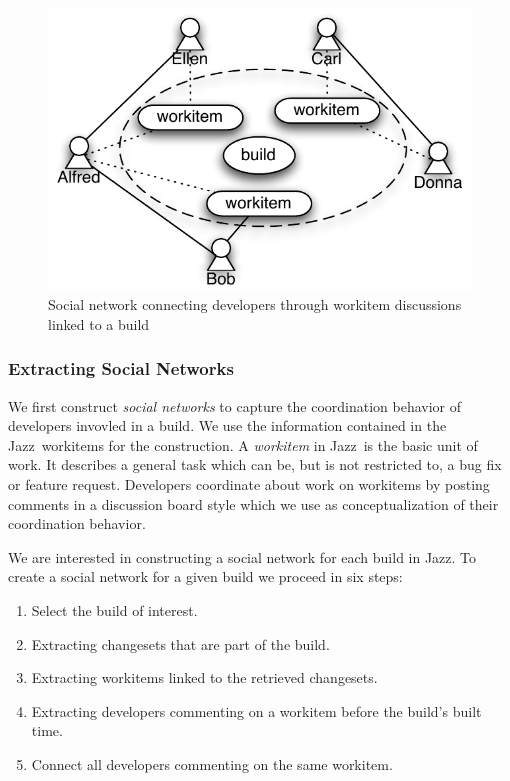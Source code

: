 \documentclass{sig-alternate}
\begin{document}
\begin{figure}[t]
\centering
\includegraphics[width=.8\columnwidth]{buildsn}
\caption{Social network connecting developers through workitem discussions linked to a build}
\label{fig:buildsn}
\end{figure}

\subsubsection{Extracting Social Networks}
We first construct \emph{social networks} to capture the coordination behavior of
developers invovled in a build. We use the information contained in the
Jazz\texttrademark\ workitems for the construction. A \emph{workitem} in Jazz\texttrademark\ is the basic unit of
work. It describes a general task which can be, but is not restricted to, a bug fix or feature request.
Developers coordinate about work on workitems by posting comments in a
discussion board style which we use as conceptualization of their coordination behavior. 


We are interested in constructing a social network for each
build in Jazz\texttrademark. 
To create a social network for a given build we proceed in six steps:

\begin{enumerate}
\item Select the build of interest.
\item Extracting changesets that are part of the build.
\item Extracting workitems linked to the retrieved changesets.
\item Extracting developers commenting on a workitem before the build's built time.
\item Connect all developers commenting on the same workitem.
\end{enumerate}
\end{document}
